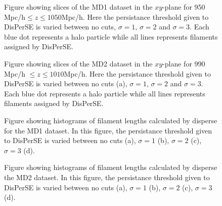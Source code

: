 \begin{center}
\begin{figure}[H]
    \centering
    \caption{Figure showing slices of the MD1 dataset in the $xy$-plane for $950$Mpc/h$\leq z\leq1050$Mpc/h. Here the persistance threshold given to DisPerSE is varied between no cuts, $\sigma=1$, $\sigma=2$ and $\sigma=3$. Each blue dot represents a halo particle while all lines represents filaments assigned by DisPerSE.}
    \label{fig:scatterMD1}
\end{figure}
\end{center}

\begin{figure}[H]
    \centering
    \caption{Figure showing slices of the MD2 dataset in the $xy$-plane for $990$Mpc/h $\leq z\leq1010$Mpc/h. Here the persistance threshold given to DisPerSE is varied between no cuts (a), $\sigma=1$, $\sigma=2$ and $\sigma=3$. Each blue dot represents a halo particle while all lines represents filaments assigned by DisPerSE.}
    \label{fig:scatterMD2}
\end{figure}

\begin{figure}[H]
    \hspace{1em}%
    \hspace{1em}%
    \caption{Figure showing histograms of filament lengths calculated by disperse for the MD1 dataset. In this figure, the persistance threshold given to DisPerSE is varied between no cuts (a), $\sigma=1$ (b), $\sigma=2$ (c), $\sigma=3$ (d). }
    \label{fig:histMD1}
\end{figure}

\begin{figure}[H]
    \hspace{2em}%
    \hspace{2em}%
    \caption{Figure showing histograms of filament lengths calculated by disperse the MD2 dataset. In this figure, the persistance threshold given to DisPerSE is varied between no cuts (a), $\sigma=1$ (b), $\sigma=2$ (c), $\sigma=3$ (d).}
    \label{fig:histMD2}
\end{figure}
